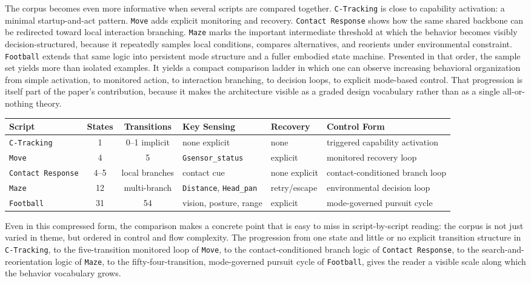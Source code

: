 \documentclass[11pt]{article}
\begin{document}
The corpus becomes even more informative when several scripts are compared together. \texttt{C-}\allowbreak\texttt{Tracking} is close to capability activation: a minimal startup-and-act pattern. \texttt{Move} adds explicit monitoring and recovery. \texttt{Contact Response} shows how the same shared backbone can be redirected toward local interaction branching. \texttt{Maze} marks the important intermediate threshold at which the behavior becomes visibly decision-structured, because it repeatedly samples local conditions, compares alternatives, and reorients under environmental constraint. \texttt{Football} extends that same logic into persistent mode structure and a fuller embodied state machine. Presented in that order, the sample set yields more than isolated examples. It yields a compact comparison ladder in which one can observe increasing behavioral organization from simple activation, to monitored action, to interaction branching, to decision loops, to explicit mode-based control. That progression is itself part of the paper's contribution, because it makes the architecture visible as a graded design vocabulary rather than as a single all-or-nothing theory.

\begin{center}
\small
\setlength{\tabcolsep}{4pt}
\begin{tabularx}{\textwidth}{@{}lcc>{\raggedright\arraybackslash}X>{\raggedright\arraybackslash}X>{\raggedright\arraybackslash}X@{}}
\hline
Script & States & Transitions & Key Sensing & Recovery & Control Form \\
\hline
\texttt{C-Tracking} & 1 & 0--1 implicit & none explicit & none & triggered capability activation \\
\texttt{Move} & 4 & 5 & \texttt{Gsensor\_}\allowbreak\texttt{status} & explicit & monitored recovery loop \\
\texttt{Contact Response} & 4--5 & local branches & contact cue & none explicit & contact-conditioned branch loop \\
\texttt{Maze} & 12 & multi-branch & \texttt{Distance}, \texttt{Head\_pan} & retry/escape & environmental decision loop \\
\texttt{Football} & 31 & 54 & vision, posture, range & explicit & mode-governed pursuit cycle \\
\hline
\end{tabularx}
\end{center}

Even in this compressed form, the comparison makes a concrete point that is easy to miss in script-by-script reading: the corpus is not just varied in theme, but ordered in control and flow complexity. The progression from one state and little or no explicit transition structure in \texttt{C-Tracking}, to the five-transition monitored loop of \texttt{Move}, to the contact-conditioned branch logic of \texttt{Contact Response}, to the search-and-reorientation logic of \texttt{Maze}, to the fifty-four-transition, mode-governed pursuit cycle of \texttt{Football}, gives the reader a visible scale along which the behavior vocabulary grows.
\end{document}
